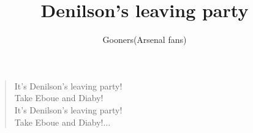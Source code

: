 \documentclass[a4paper,12pt]{article}
\title{Denilson's leaving party}
\author{Gooners(Arsenal fans)}
\date{}
\begin{document}
	
	\maketitle
	
	\begin{verse}
		
		It's Denilson's leaving party! \\
		Take Eboue and Diaby! \\
		It's Denilson's leaving party! \\
		Take Eboue and Diaby!$\ldots$
		
	\end{verse}
	
\end{document}
